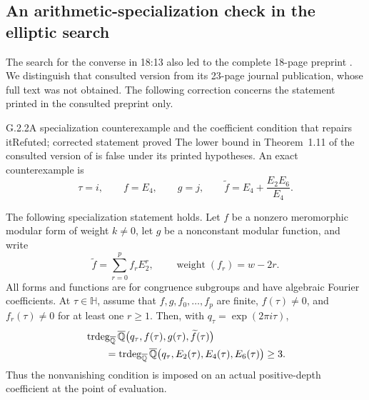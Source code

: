\subsection{An arithmetic-specialization check in the elliptic search}

The search for the converse in 18:13 also led to the complete
18-page preprint \cite{BhowmikPathak2024}. We distinguish that
consulted version from its 23-page journal publication, whose
full text was not obtained. The following correction concerns
the statement printed in the consulted preprint only.

\begin{result}{G.2.2}{A specialization counterexample and the coefficient condition that repairs it}{Refuted; corrected statement proved}
The lower bound in Theorem~1.11 of the consulted version of
\cite{BhowmikPathak2024} is false under its printed hypotheses.
An exact counterexample is
\[
 \tau=i,\qquad f=E_4,\qquad g=j,\qquad
 \widetilde f=E_4+\frac{E_2E_6}{E_4}.
 \tag{G.2.2a}
\]

The following specialization statement holds. Let $f$ be a
nonzero meromorphic modular form of weight $k\ne0$, let $g$
be a nonconstant modular function, and write
\[
 \widetilde f=\sum_{r=0}^p f_r E_2^r,
 \qquad \operatorname{weight}(f_r)=w-2r.
\]
All forms and functions are for congruence subgroups and have
algebraic Fourier coefficients. At $\tau\in\mathbb H$, assume
that $f,g,f_0,\ldots,f_p$ are finite, $f(\tau)\ne0$, and
$f_r(\tau)\ne0$ for at least one $r\ge1$. Then, with
$q_\tau=\exp(2\pi i\tau)$,
\[
\begin{split}
 &\operatorname{trdeg}_{\overline{\mathbb Q}}\overline{\mathbb Q}
   \bigl(q_\tau,f(\tau),g(\tau),\widetilde f(\tau)\bigr)\\
 &\qquad=\operatorname{trdeg}_{\overline{\mathbb Q}}\overline{\mathbb Q}
   \bigl(q_\tau,E_2(\tau),E_4(\tau),E_6(\tau)\bigr)
   \ge3.
\end{split}
\]
Thus the nonvanishing condition is imposed on an actual
positive-depth coefficient at the point of evaluation.
\end{result}
